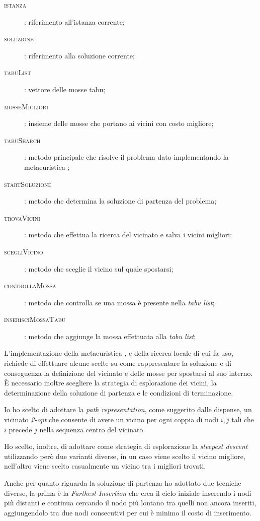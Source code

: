 \begin{description}
\begin{description}
		\item[\textsc{istanza}]: riferimento all'istanza corrente;
		\item[\textsc{soluzione}]: riferimento alla soluzione corrente;
		\item[\textsc{tabuList}]: vettore delle mosse tabu;
		\item[\textsc{mosseMigliori}]: insieme delle mosse che portano ai vicini con costo migliore;
		\item[\textsc{tabuSearch}]: metodo principale che risolve il problema dato implementando la metaeuristica \tabu;
		\item[\textsc{startSoluzione}]: metodo che determina la soluzione di partenza del problema;
		\item[\textsc{trovaVicini}]: metodo che effettua la ricerca del vicinato e salva i vicini migliori;
		\item[\textsc{scegliVicino}]: metodo che sceglie il vicino sul quale spostarsi;
		\item[\textsc{controllaMossa}]: metodo che controlla se una mossa è presente nella \emph{tabu list};
		\item[\textsc{inserisciMossaTabu}]: metodo che aggiunge la mossa effettuata alla \emph{tabu list};
	\end{description}
\end{description}

L'implementazione della metaeuristica \tabu, e della ricerca locale di cui fa uso, richiede di effettuare alcune scelte su come rappresentare la soluzione e di conseguenza la definizione del vicinato e delle mosse per spostarsi al suo interno. È necessario inoltre scegliere la strategia di esplorazione dei vicini, la determinazione della soluzione di partenza e le condizioni di terminazione.

Io ho scelto di adottare la \emph{path representation}, come suggerito dalle dispense, un vicinato \emph{2-opt} che consente di avere un vicino per ogni coppia di nodi $i, j$ tali che $i$ precede $j$ nella sequenza centro del vicinato.

Ho scelto, inoltre, di adottare come strategia di esplorazione la \emph{steepest descent} utilizzando però due varianti diverse, in un caso viene scelto il vicino migliore, nell'altro viene scelto casualmente un vicino tra i migliori trovati.

Anche per quanto riguarda la soluzione di partenza ho adottato due tecniche diverse, la prima è la \emph{Farthest Insertion} che crea il ciclo iniziale inserendo i nodi più distanti e continua cercando il nodo più lontano tra quelli non ancora inseriti, aggiungendolo tra due nodi consecutivi per cui è minimo il costo di inserimento.

